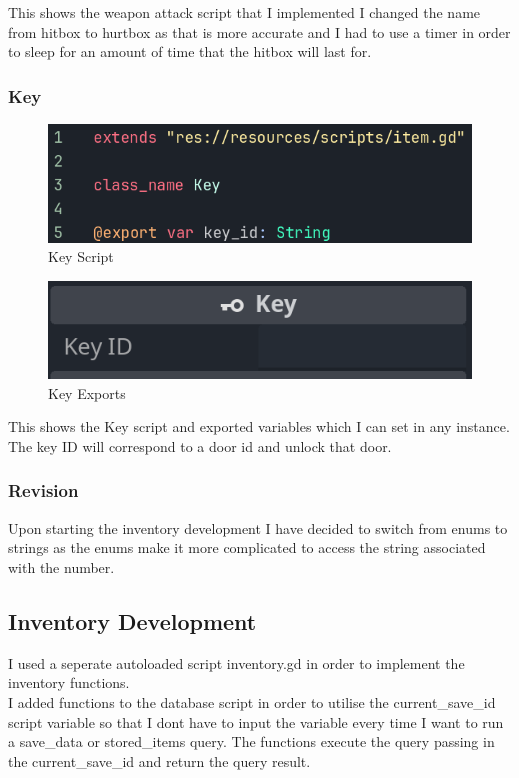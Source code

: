 \documentclass{article}
\begin{document}
        \noindent This shows the weapon attack script that I implemented I changed the name from hitbox to hurtbox as that is more accurate and I had to use a timer in order to sleep for an amount of time that the hitbox will last for.\\
        \subsubsection{Key}
        \begin{multicols}{2}
                \begin{figure}[H]
                        \centering
                        \includegraphics[width = \columnwidth]{images/development/Key_script.PNG}
                        \caption{Key Script}
                \end{figure}
                \begin{figure}[H]
                        \centering
                        \includegraphics[width = 0.9\columnwidth]{images/development/Key_export.PNG}
                        \caption{Key Exports}
                \end{figure}
        \end{multicols}
        \[\]
        This shows the Key script and exported variables which I can set in any instance. The key ID will correspond to a door id and unlock that door.\\
        \subsubsection{Revision}
        Upon starting the inventory development I have decided to switch from enums to strings as the enums make it more complicated to access the string associated with the number.\\
        \subsection{Inventory Development}
        I used a seperate autoloaded script inventory.gd in order to implement the inventory functions.\\
        I added functions to the database script in order to utilise the current\_save\_id script variable so that I dont have to input the variable every time I want to run a save\_data or stored\_items query. The functions execute the query passing in the current\_save\_id and return the query result.\\
\end{document}
